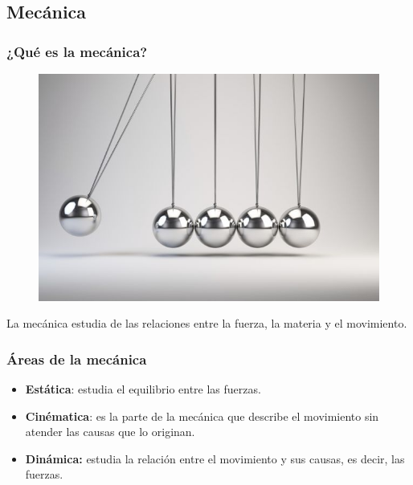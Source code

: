 \subsection{Mecánica}
\begin{frame}
\frametitle{¿Qué es la mecánica?}
\begin{figure}
    \centering
    \includegraphics[scale=0.3]{./Imagenes/pendulo_newton.jpg}
\end{figure}
La mecánica estudia de las relaciones entre la fuerza, la materia y el movimiento.
\end{frame}
\begin{frame}
\frametitle{Áreas de la mecánica}
\begin{itemize}[<+->]
\item \textbf{Estática}: estudia el equilibrio entre las fuerzas.
\item \textbf{Cinématica}: es la parte de la mecánica que describe el movimiento sin atender las causas que lo originan.
\item \textbf{Dinámica:} estudia la relación entre el movimiento y sus causas, es decir, las fuerzas.
\end{itemize}
\end{frame}
